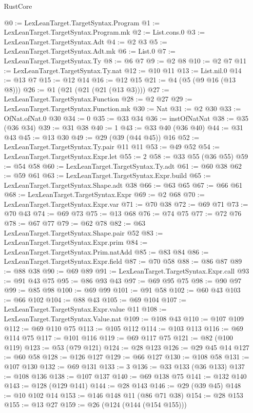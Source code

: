 \begin{lexlean}{RustCore}
\begin{coremodule}
@0 := LexLeanTarget.TargetSyntax.Program
@1 := LexLeanTarget.TargetSyntax.Program.mk
@2 := List.cons.{0}
@3 := LexLeanTarget.TargetSyntax.Adt
@4 := @2 @3
@5 := LexLeanTarget.TargetSyntax.Adt.mk
@6 := List.{0}
@7 := LexLeanTarget.TargetSyntax.Ty
@8 := @6 @7
@9 := @2 @8
@10 := @2 @7
@11 := LexLeanTarget.TargetSyntax.Ty.nat
@12 := @10 @11
@13 := List.nil.{0}
@14 := @13 @7
@15 := @12 @14
@16 := @12 @15
@21 := @4 (@5 (@9 @16 (@13 @8)))
@26 := @1 (@21 (@21 (@21 (@13 @3))))
@27 := LexLeanTarget.TargetSyntax.Function
@28 := @2 @27
@29 := LexLeanTarget.TargetSyntax.Function.mk
@30 := Nat
@31 := @2 @30
@33 := OfNat.ofNat.{0} @30
@34 := 0
@35 := @33 @34
@36 := instOfNatNat
@38 := @35 (@36 @34)
@39 := @31 @38
@40 := 1
@43 := @33 @40 (@36 @40)
@44 := @31 @43
@45 := @13 @30
@49 := @29 (@39 (@44 @45)) @16
@52 := LexLeanTarget.TargetSyntax.Ty.pair @11 @11
@53 := @49 @52
@54 := LexLeanTarget.TargetSyntax.Expr.let
@55 := 2
@58 := @33 @55 (@36 @55)
@59 := @54 @58
@60 := LexLeanTarget.TargetSyntax.Ty.adt
@61 := @60 @38
@62 := @59 @61
@63 := LexLeanTarget.TargetSyntax.Expr.build
@65 := LexLeanTarget.TargetSyntax.Shape.adt @38
@66 := @63 @65
@67 := @66 @61
@68 := LexLeanTarget.TargetSyntax.Expr
@69 := @2 @68
@70 := LexLeanTarget.TargetSyntax.Expr.var
@71 := @70 @38
@72 := @69 @71
@73 := @70 @43
@74 := @69 @73
@75 := @13 @68
@76 := @74 @75
@77 := @72 @76
@78 := @67 @77
@79 := @62 @78
@82 := @63 LexLeanTarget.TargetSyntax.Shape.pair @52
@83 := LexLeanTarget.TargetSyntax.Expr.prim
@84 := LexLeanTarget.TargetSyntax.Prim.natAdd
@85 := @83 @84
@86 := LexLeanTarget.TargetSyntax.Expr.field
@87 := @70 @58
@88 := @86 @87
@89 := @88 @38
@90 := @69 @89
@91 := LexLeanTarget.TargetSyntax.Expr.call
@93 := @91 @43 @75
@95 := @86 @93 @43
@97 := @69 @95 @75
@98 := @90 @97
@99 := @85 @98
@100 := @69 @99
@101 := @91 @58
@102 := @60 @43
@103 := @66 @102
@104 := @88 @43
@105 := @69 @104
@107 := LexLeanTarget.TargetSyntax.Expr.value @11
@108 := LexLeanTarget.TargetSyntax.Value.nat
@109 := @108 @43
@110 := @107 @109
@112 := @69 @110 @75
@113 := @105 @112
@114 := @103 @113
@116 := @69 @114 @75
@117 := @101 @116
@119 := @69 @117 @75
@121 := @82 (@100 @119)
@123 := @53 (@79 @121)
@124 := @28 @123
@126 := @29 @45 @14
@127 := @60 @58
@128 := @126 @127
@129 := @66 @127
@130 := @108 @58
@131 := @107 @130
@132 := @69 @131
@133 := 3
@136 := @33 @133 (@36 @133)
@137 := @108 @136
@138 := @107 @137
@140 := @69 @138 @75
@141 := @132 @140
@143 := @128 (@129 @141)
@144 := @28 @143
@146 := @29 (@39 @45)
@148 := @10 @102 @14
@153 := @146 @148 @11 (@86 @71 @38)
@154 := @28 @153
@155 := @13 @27
@159 := @26 (@124 (@144 (@154 @155)))

\end{coremodule}
\end{lexlean}
